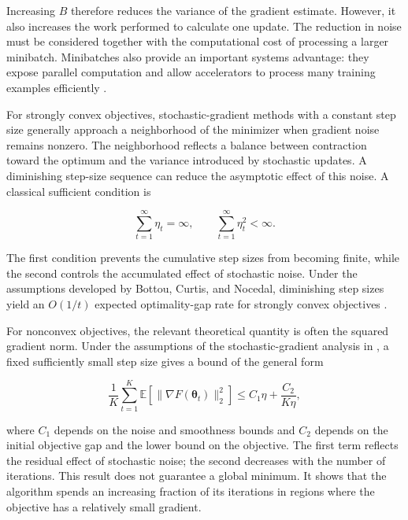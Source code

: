Increasing $B$ therefore reduces the variance of the gradient estimate.
However, it also increases the work performed to calculate one update.
The reduction in noise must be considered together with the computational
cost of processing a larger minibatch. Minibatches also provide an
important systems advantage: they expose parallel computation and allow
accelerators to process many training examples efficiently
\parencite{Bottou2018Optimization,Ranganath2026Navigating}.

For strongly convex objectives, stochastic-gradient methods with a constant
step size generally approach a neighborhood of the minimizer when gradient
noise remains nonzero. The neighborhood reflects a balance between
contraction toward the optimum and the variance introduced by stochastic
updates. A diminishing step-size sequence can reduce the asymptotic effect
of this noise. A classical sufficient condition is

\begin{equation}
    \sum_{t=1}^{\infty}\eta_t=\infty,
    \qquad
    \sum_{t=1}^{\infty}\eta_t^2<\infty.
    \label{eq:opt-robbins-monro-steps}
\end{equation}

The first condition prevents the cumulative step sizes from becoming
finite, while the second controls the accumulated effect of stochastic
noise. Under the assumptions developed by Bottou, Curtis, and Nocedal,
diminishing step sizes yield an $O(1/t)$ expected optimality-gap rate for
strongly convex objectives \parencite{Bottou2018Optimization}.

For nonconvex objectives, the relevant theoretical quantity is often the
squared gradient norm. Under the assumptions of the stochastic-gradient
analysis in \textcite{Bottou2018Optimization}, a fixed sufficiently small
step size gives a bound of the general form

\begin{equation}
    \frac{1}{K}
    \sum_{t=1}^{K}
    \mathbb{E}
    \left[
        \|\nabla F(\boldsymbol{\theta}_t)\|_2^2
    \right]
    \leq
    C_1\eta+
    \frac{C_2}{K\eta},
    \label{eq:opt-nonconvex-stationarity}
\end{equation}

where $C_1$ depends on the noise and smoothness bounds and $C_2$ depends
on the initial objective gap and the lower bound on the objective. The
first term reflects the residual effect of stochastic noise; the second
decreases with the number of iterations. This result does not guarantee a
global minimum. It shows that the algorithm spends an increasing fraction
of its iterations in regions where the objective has a relatively small
gradient.


